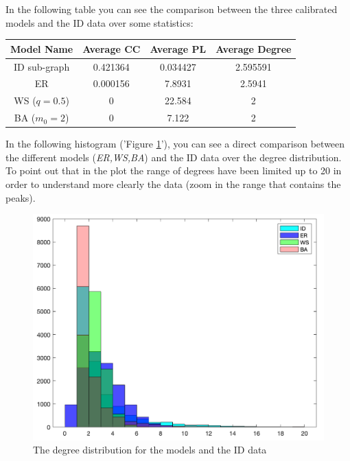 \documentclass{article}
\begin{document}
\bigskip
\noindent In the following table you can see the comparison between the three calibrated models and the ID data over some statistics:\newline
\begin{center}
    \begin{tabular}{ |c|c|c|c| } 
    \hline
    Model Name & Average CC & Average PL & Average Degree \\
    \hline
    ID sub-graph & 0.421364 & 0.034427 & 2.595591 \\
    ER & 0.000156 & 7.8931 & 2.5941 \\
    WS (\(q=0.5\)) & 0 & 22.584 & 2 \\
    BA (\(m_{0}=2\)) & 0 & 7.122 & 2 \\
    \hline
    \end{tabular}
\end{center}
\bigskip
\bigskip
    \par\noindent In the following histogram ('Figure \ref{fig:figure-3}'), you can see a direct comparison between the different models (\textit{ER,WS,BA}) and the ID data over the degree distribution.\newline
    To point out that in the plot the range of degrees have been limited up to 20 in order to understand more clearly the data (zoom in the range that contains the peaks).

    \begin{figure}[H]
            \centering
            \includegraphics[width=1\textwidth]{3.png}
            \caption{The degree distribution for the models and the ID data}
            \label{fig:figure-3}
    \end{figure}
    
\end{document}
